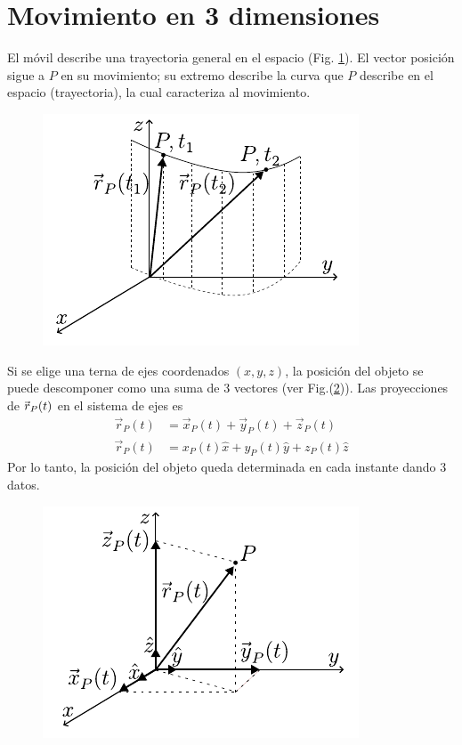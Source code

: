 \section{Movimiento en 3 dimensiones}
El móvil describe una trayectoria general en el espacio (Fig. \ref{fig:1-14}). El vector posición sigue a $P$ en su 
movimiento; su extremo describe la curva que $P$ describe en el espacio (trayectoria), la cual caracteriza al 
movimiento.

\begin{figure}[htbp]
  \centering
  \includegraphics[]{images/f1-14.pdf}
  \caption{}
  \label{fig:1-14}
\end{figure} 
\para
Si se elige una terna de ejes coordenados $(x,y,z)$, la posición del objeto se puede descomponer como una suma de 3 
vectores (ver Fig.(\ref{fig:1-15})). Las proyecciones de $\skew{-2.0}\vec{r}_P(t)$ en el sistema de ejes es
\begin{align}
  \vec{r}_P(t) &= \vec{x}_P(t) + \vec{y}_P(t) + \vec{z}_P(t) \nonumber \\ 
  \vec{r}_P(t) &=  x_P(t) \hat{x} + y_P(t) \hat{y} + z_P(t) \hat{z}
  \label{eq:1-2}
\end{align}
Por lo tanto, la posición del objeto queda determinada en cada instante dando 3 datos.

\begin{figure}[htbp]
  \centering
  \includegraphics[]{images/f1-15.pdf}
  \caption{}
  \label{fig:1-15}
\end{figure}

